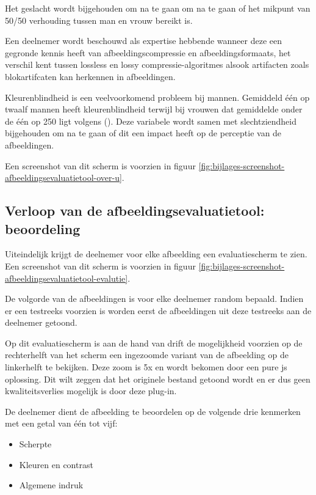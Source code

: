 Het geslacht wordt bijgehouden om na te gaan om na te gaan of het mikpunt van 50/50 verhouding tussen man en vrouw bereikt is.

Een deelnemer wordt beschouwd als expertise hebbende wanneer deze een gegronde kennis heeft van \gls{afbeeldingscompressie} en \glspl{afbeeldingsformaat}, het verschil kent tussen \gls{lossless} en \gls{lossy} \glspl{compressie-algoritme} alsook artifacten zoals blokartifcaten kan herkennen in afbeeldingen.

Kleurenblindheid is een veelvoorkomend probleem bij mannen. Gemiddeld één op twaalf mannen heeft kleurenblindheid terwijl bij vrouwen dat gemiddelde onder de één op 250 ligt volgens  (\cite{porcella2008}). Deze variabele wordt samen met slechtziendheid bijgehouden om na te gaan of dit een impact heeft op de perceptie van de afbeeldingen.

Een screenshot van dit scherm is voorzien in figuur \ref{fig:bijlages-screenshot-afbeeldingsevaluatietool-over-u}.

\subsection{Verloop  van de afbeeldingsevaluatietool: beoordeling}
\label{sec:onderzoek-evaluatietool-verloop-beoordeling}

Uiteindelijk krijgt de deelnemer voor elke afbeelding een evaluatiescherm te zien. Een screenshot van dit scherm is voorzien in figuur \ref{fig:bijlages-screenshot-afbeeldingsevaluatietool-evalutie}.

De volgorde van de afbeeldingen is voor elke deelnemer random bepaald. Indien er een testreeks voorzien is worden eerst de afbeeldingen uit deze testreeks aan de deelnemer getoond.

Op dit evaluatiescherm is aan de hand van \gls{drift} de mogelijkheid voorzien op de rechterhelft van het scherm een ingezoomde variant van de afbeelding op de linkerhelft te bekijken. Deze zoom is 5x en wordt bekomen door een pure \gls{js} oplossing. Dit wilt zeggen dat het originele bestand getoond wordt en er dus geen kwaliteitsverlies mogelijk is door deze \gls{plug-in}.

De deelnemer dient de afbeelding te beoordelen op de volgende drie kenmerken met een getal van één tot vijf:

\begin{itemize}
	\item Scherpte
	\item Kleuren en contrast
	\item Algemene indruk
\end{itemize}

